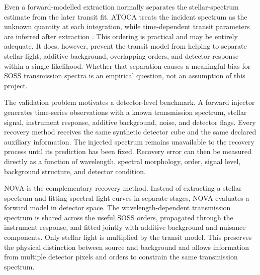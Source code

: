 
Even a forward-modelled extraction normally separates the stellar-spectrum
estimate from the later transit fit. ATOCA treats the incident spectrum as the
unknown quantity at each integration, while time-dependent transit parameters
are inferred after extraction
\citep{DarveauBernierEtAl2022,BellEtAl2022,RadicaEtAl2023}. This ordering is practical and may be entirely
adequate. It does, however, prevent the transit model from helping to separate
stellar light, additive background, overlapping orders, and detector response
within a single likelihood. Whether that separation causes a meaningful bias
for SOSS transmission spectra is an empirical question, not an assumption of
this project.


The validation problem motivates a detector-level benchmark. A forward injector
generates time-series observations with a known transmission spectrum,
stellar signal, instrument response, additive background, noise, and detector
flags. Every recovery method receives the same synthetic detector cube and
the same declared auxiliary information. The injected spectrum remains
unavailable to the recovery process until its prediction has been fixed.
Recovery error can then be measured directly as a function of wavelength,
spectral morphology, order, signal level, background structure, and detector
condition.


NOVA is the complementary recovery method. Instead of extracting a stellar
spectrum and fitting spectral light curves in separate stages, NOVA evaluates a
forward model in detector space. The wavelength-dependent transmission spectrum
is shared across the useful SOSS orders, propagated through the instrument
response, and fitted jointly with additive background and nuisance components.
Only stellar light is multiplied by the transit model. This preserves the
physical distinction between source and background and allows information from
multiple detector pixels and orders to constrain the same transmission
spectrum.

